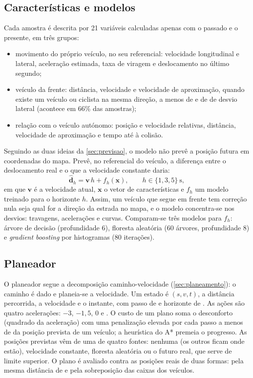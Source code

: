 \subsection{Características e modelos}

Cada amostra é descrita por 21 variáveis calculadas apenas com o passado e
o presente, em três grupos:
\begin{itemize}
  \item movimento do próprio veículo, no seu referencial: velocidade
    longitudinal e lateral, aceleração estimada, taxa de viragem e
    deslocamento no último segundo;
  \item veículo da frente: distância, velocidade e velocidade de
    aproximação, quando existe um veículo ou ciclista na mesma direção, a
    menos de  e de  de desvio lateral (acontece em
    66\% das amostras);
  \item relação com o veículo autónomo: posição e velocidade relativas,
    distância, velocidade de aproximação e tempo até à colisão.
\end{itemize}

Seguindo as duas ideias da \cref{sec:previsao}, o modelo não prevê a
posição futura em coordenadas do mapa. Prevê, no referencial do veículo,
a diferença entre o deslocamento real e o que a velocidade constante
daria:
\begin{equation}
  \hat{\mathbf{d}}_h = \mathbf{v}\,h + f_h(\mathbf{x}),
  \qquad h \in \{1, 3, 5\}~\mathrm{s},
\end{equation}
em que $\mathbf{v}$ é a velocidade atual, $\mathbf{x}$ o vetor de
características e $f_h$ um modelo treinado para o horizonte $h$. Assim, um
veículo que segue em frente tem correção nula seja qual for a direção da
estrada no mapa, e o modelo concentra-se nos desvios: travagens,
acelerações e curvas. Comparam-se três modelos para $f_h$: árvore de
decisão (profundidade 6), floresta aleatória (60 árvores, profundidade 8)
e \emph{gradient boosting} por histogramas (80 iterações).

\subsection{Planeador}

O planeador segue a decomposição caminho-velocidade
(\cref{sec:planeamento}): o caminho é dado e planeia-se a velocidade. Um
estado é $(s, v, t)$, a distância percorrida, a velocidade e o instante,
com passo de  e horizonte de . As ações são quatro
acelerações: $-3$, $-1,5$, $0$ e . O custo de um plano
soma o desconforto (quadrado da aceleração) com uma penalização elevada
por cada passo a menos de  da posição prevista de um veículo; a
heurística do A* premeia o progresso. As posições previstas vêm de uma de
quatro fontes: nenhuma (os outros ficam onde estão), velocidade constante,
floresta aleatória ou o futuro real, que serve de limite superior. O
plano é avaliado contra as posições reais de duas formas: pela mesma
distância de  e pela sobreposição das caixas dos veículos.


